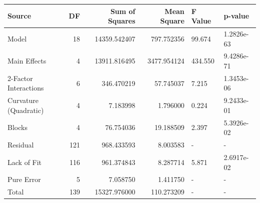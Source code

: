 \begin{tabular}{lrrrll}
\toprule
Source & DF & Sum of Squares & Mean Square & F Value & p-value \\
\midrule
Model & 18 & 14359.542407 & 797.752356 & 99.674 & 1.2826e-63 \\
  Main Effects & 4 & 13911.816495 & 3477.954124 & 434.550 & 9.4286e-71 \\
  2-Factor Interactions & 6 & 346.470219 & 57.745037 & 7.215 & 1.3453e-06 \\
  Curvature (Quadratic) & 4 & 7.183998 & 1.796000 & 0.224 & 9.2433e-01 \\
  Blocks & 4 & 76.754036 & 19.188509 & 2.397 & 5.3926e-02 \\
Residual & 121 & 968.433593 & 8.003583 & - & - \\
  Lack of Fit & 116 & 961.374843 & 8.287714 & 5.871 & 2.6917e-02 \\
  Pure Error & 5 & 7.058750 & 1.411750 & - & - \\
Total & 139 & 15327.976000 & 110.273209 & - & - \\
\bottomrule
\end{tabular}
